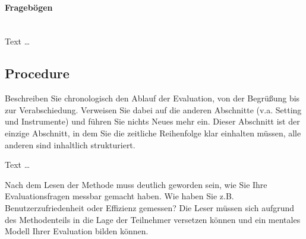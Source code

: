 \documentclass[11pt,a4paper,english]{scrreprt}
\newenvironment{comment}
  {\par\medskip
   \begingroup\color{olive}%
   }
 {\endgroup
  \medskip}
\begin{document}
\paragraph{Fragebögen}\mbox{} \\
Text \dots

\subsection{Procedure}
\begin{comment}
Beschreiben Sie chronologisch den Ablauf der Evaluation, von der Begrüßung bis zur Verabschiedung. Verweisen Sie dabei auf die anderen Abschnitte (v.a. Setting und Instrumente) und führen Sie nichts Neues mehr ein. Dieser Abschnitt ist der einzige Abschnitt, in dem Sie die zeitliche Reihenfolge klar einhalten müssen, alle anderen sind inhaltlich strukturiert.
\end{comment}

Text \dots

\begin{comment}
Nach dem Lesen der Methode muss deutlich geworden sein, wie Sie Ihre Evaluationsfragen messbar gemacht haben. Wie haben Sie z.B. Benutzerzufriedenheit oder Effizienz gemessen? Die Leser müssen sich aufgrund des Methodenteils in die Lage der Teilnehmer versetzen können und ein mentales Modell Ihrer Evaluation bilden können.
\end{comment}
\end{document}
